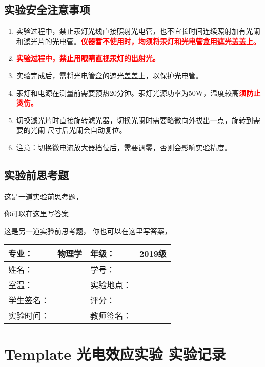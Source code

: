 \documentclass[dvipsnames, svgnames,a4paper,11pt]{article}
\begin{document}
\subsection{实验安全注意事项}
\begin{enumerate}
	\item 实验过程中，禁止汞灯光线直接照射光电管，也不宜长时间连续照射加有光阑和滤光片的光电管。\textcolor{red}{\textbf{仪器暂不使用时，均须将汞灯和光电管盒用遮光盖盖上。}}
	\item \textcolor{red}{\textbf{ 实验过程中，禁止用眼睛直视汞灯的出射光。}}
	\item 实验完成后，需将光电管盒的遮光盖盖上，以保护光电管。
	\item 汞灯和电源在测量前需要预热20分钟。汞灯光源功率为50W，温度较高\textcolor{red}{\textbf{须防止烫伤。}}
	\item 切换滤光片时直接旋转滤光器，切换光阑时需要略微向外拔出一点，旋转到需要的光阑
	尺寸后光阑会自动复位。
	\item 注意：切换微电流放大器档位后，需要调零，否则会影响实验精度。	
\end{enumerate}

\subsection{实验前思考题}
\begin{question}
	这是一道实验前思考题，\lipsum[10]
\end{question}
你可以在这里写答案

\begin{question}
	这是另一道实验前思考题，\lipsum[11]
	\tcblower
	你也可以在这里写答案，\lipsum[12]
\end{question}
\clearpage
\begin{table}
	\renewcommand\arraystretch{1.7}
	\centering
	\begin{tabularx}{\textwidth}{|X|X|X|X|}
	\hline
	专业：& 物理学 &年级：& 2019级 \\
	\hline
	姓名： & & 学号：&\\
	\hline
	室温：& & 实验地点： & \\
	\hline
	学生签名：& & 评分： &\\
	\hline
	实验时间：& & 教师签名：&\\
	\hline
	\end{tabularx}
\end{table}

\section{Template 光电效应实验 \quad\heiti 实验记录}
\end{document}
